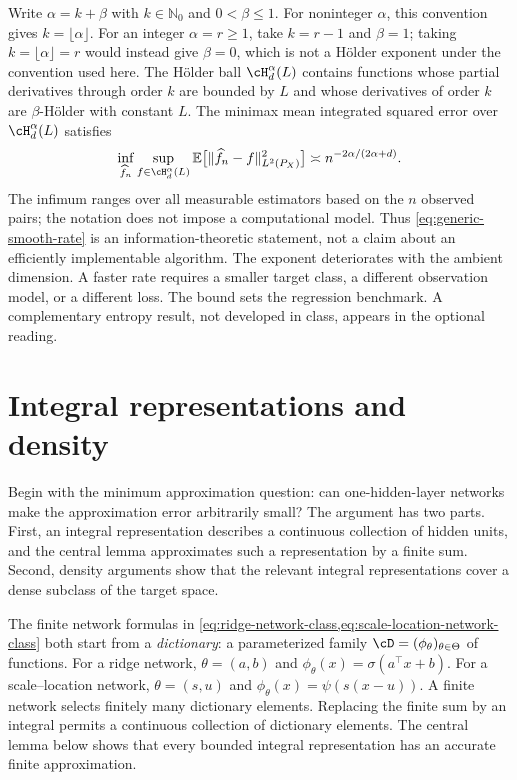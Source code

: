 \documentclass[11pt,twoside]{article}
\newcommand{\E}{\mathbb E}
\theoremstyle{definition}
\theoremstyle{remark}
\begin{document}
Write $\alpha=k+\beta$ with $k\in\mathbb N_0$ and $0<\beta\leq1$. For
noninteger $\alpha$, this convention gives $k=\lfloor\alpha\rfloor$. For an
integer $\alpha=r\geq1$, take $k=r-1$ and $\beta=1$; taking
$k=\lfloor\alpha\rfloor=r$ would instead give $\beta=0$, which is not a
H\"older exponent under the convention used here. The H\"older ball
$\cH_d^\alpha(L)$ contains functions whose partial derivatives through order
$k$ are bounded by $L$ and whose derivatives of order $k$ are
$\beta$-H\"older with constant $L$. The minimax mean integrated squared error
over \(\cH_d^\alpha(L)\)
satisfies
\begin{equation}
 \inf_{\widehat f_n}\sup_{f\in\cH_d^\alpha(L)}
 \E\bigl[\|\widehat f_n-f\|_{L^2(P_X)}^2\bigr]
 \asymp n^{-2\alpha/(2\alpha+d)}.
 \label{eq:generic-smooth-rate}
\end{equation}
The infimum ranges over all measurable estimators based on the $n$ observed
pairs; the notation does not impose a computational model. Thus
\cref{eq:generic-smooth-rate} is an information-theoretic statement, not a
claim about an efficiently implementable algorithm. The exponent deteriorates
with the ambient dimension. A faster rate requires a smaller target class, a
different observation model, or a different loss. The bound sets the
regression benchmark. A complementary entropy result, not developed in
class, appears in the optional reading.

\section{Integral representations and density}
\label{sec:sampling}
Begin with the minimum approximation question: can one-hidden-layer networks
make the approximation error arbitrarily small? The argument has two parts.
First, an integral representation describes a continuous collection of hidden
units, and the central lemma approximates such a representation by a finite
sum. Second, density arguments show that the relevant integral
representations cover a dense subclass of the target space.

The finite network formulas in
\cref{eq:ridge-network-class,eq:scale-location-network-class} both start from
a \emph{dictionary}: a parameterized family
\(\cD=(\phi_\theta)_{\theta\in\Theta}\) of functions. For a ridge network,
\(\theta=(a,b)\) and
\(\phi_\theta(x)=\sigma(a^\top x+b)\). For a scale--location network,
\(\theta=(s,u)\) and \(\phi_\theta(x)=\psi(s(x-u))\). A finite network
selects finitely many dictionary elements. Replacing the finite sum by an
integral permits a continuous collection of dictionary elements. The central
lemma below shows that every bounded integral representation has an accurate
finite approximation.
\end{document}
